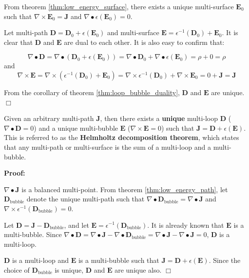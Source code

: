 From theorem \ref{thm:low_energy_surface}, there exists a unique multi-surface \(\mathbf{E}_0\) such that \(\nabla \times \mathbf{E}_0 = \mathbf{J}\) and \(\nabla \bullet \epsilon(\mathbf{E}_0) = 0\). 

Let multi-path \(\mathbf{D} = \mathbf{D}_0 + \epsilon(\mathbf{E}_0)\) and multi-surface \(\mathbf{E} = \epsilon^{-1}(\mathbf{D}_0) + \mathbf{E}_0\). It is clear that \(\mathbf{D}\) and \(\mathbf{E}\) are dual to each other. It is also easy to confirm that:

\[\nabla \bullet \mathbf{D} = \nabla \bullet (\mathbf{D}_0 + \epsilon(\mathbf{E}_0)) = \nabla \bullet \mathbf{D}_0 + \nabla \bullet \epsilon(\mathbf{E}_0) = \rho + 0 = \rho\]      
and 
\[\nabla \times \mathbf{E} = \nabla \times (\epsilon^{-1}(\mathbf{D}_0) + \mathbf{E}_0) = \nabla \times \epsilon^{-1}(\mathbf{D}_0) + \nabla \times \mathbf{E}_0 = 0 + \mathbf{J} = \mathbf{J}\]

From the corollary of theorem \ref{thm:loop_bubble_duality}, \(\mathbf{D}\) and \(\mathbf{E}\) are unique. \(\Box\)


\begin{thm}\label{thm:helmholtz_decomposition_theorem} 
Given an arbitrary multi-path \(\mathbf{J}\), then there exists a {\bf unique} multi-loop \(\mathbf{D}\) (\(\nabla \bullet \mathbf{D} = 0\)) and a unique multi-bubble \(\mathbf{E}\) (\(\nabla \times \mathbf{E} = 0\)) such that \(\mathbf{J} = \mathbf{D} + \epsilon(\mathbf{E})\). This is referred to as the {\bf Helmholtz decomposition theorem}, which states that any multi-path or multi-surface is the sum of a multi-loop and a multi-bubble.
\end{thm}
\textbf{Proof:}

\(\nabla \bullet \mathbf{J}\) is a balanced multi-point. From theorem \ref{thm:low_energy_path}, let \(\mathbf{D}_{\text{bubble}}\) denote the unique multi-path such that \(\nabla \bullet \mathbf{D}_{\text{bubble}} = \nabla \bullet \mathbf{J}\) and \(\nabla \times \epsilon^{-1}(\mathbf{D}_{\text{bubble}}) = 0\).

Let \(\mathbf{D} = \mathbf{J} - \mathbf{D}_{\text{bubble}}\), and let \(\mathbf{E} = \epsilon^{-1}(\mathbf{D}_{\text{bubble}})\). It is already known that \(\mathbf{E}\) is a multi-bubble. Since \(\nabla \bullet \mathbf{D} = \nabla \bullet \mathbf{J} - \nabla \bullet \mathbf{D}_{\text{bubble}} = \nabla \bullet \mathbf{J} - \nabla \bullet \mathbf{J} = 0\), \(\mathbf{D}\) is a multi-loop. 

\(\mathbf{D}\) is a multi-loop and \(\mathbf{E}\) is a multi-bubble such that \(\mathbf{J} = \mathbf{D} + \epsilon(\mathbf{E})\). Since the choice of \(\mathbf{D}_{\text{bubble}}\) is unique, \(\mathbf{D}\) and \(\mathbf{E}\) are unique also. \(\Box\)



